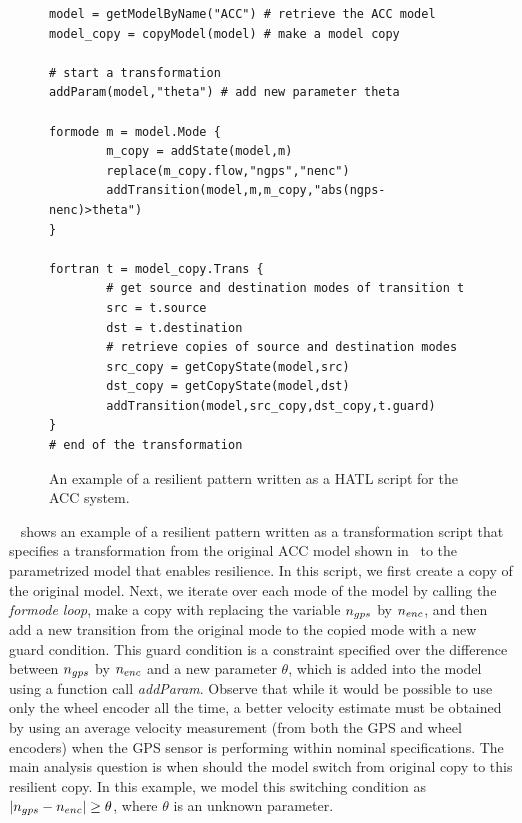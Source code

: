 %
%
\begin{figure}[!t]%
\begin{lstlisting}[basicstyle=\ttfamily\footnotesize, numbers=none]
model = getModelByName("ACC") # retrieve the ACC model
model_copy = copyModel(model) # make a model copy 
	
# start a transformation  
addParam(model,"theta") # add new parameter theta
	
formode m = model.Mode {
		m_copy = addState(model,m)
		replace(m_copy.flow,"ngps","nenc")
		addTransition(model,m,m_copy,"abs(ngps-nenc)>theta")
}

fortran t = model_copy.Trans {
		# get source and destination modes of transition t
		src = t.source	
		dst = t.destination 
		# retrieve copies of source and destination modes 
		src_copy = getCopyState(model,src)  
		dst_copy = getCopyState(model,dst) 
		addTransition(model,src_copy,dst_copy,t.guard)
}
# end of the transformation
\end{lstlisting}
\caption{An example of a resilient pattern written as a HATL script for the ACC system.}%
%
\end{figure}
%
%


~ shows an example of a resilient pattern written as a transformation script that specifies a transformation from the original ACC model shown in~ to the parametrized model that enables resilience. 
%
In this script, we first create a copy of the original model. Next, we iterate over each mode of the model by calling the \emph{formode loop}, make a copy with replacing the variable $n_{gps}$ by $n_{enc}$, and then add a new transition from the original mode to the copied mode with a new guard condition. This guard condition is a constraint specified over the difference between $n_{gps}$ by $n_{enc}$ and a new parameter $\theta$, which is added into the model using a function call \emph{addParam}.
%
%
Observe that while it would be possible to use only the wheel encoder all the time, a better velocity estimate must be obtained by using an average velocity measurement (from both the GPS and wheel encoders) when the GPS sensor is performing within nominal specifications. The main analysis question is when should the model switch from original copy to this resilient copy.  In this example, we model this switching condition as $|n_{gps} -n_{enc}| \geq \theta$, where $\theta$ is an unknown parameter. 




